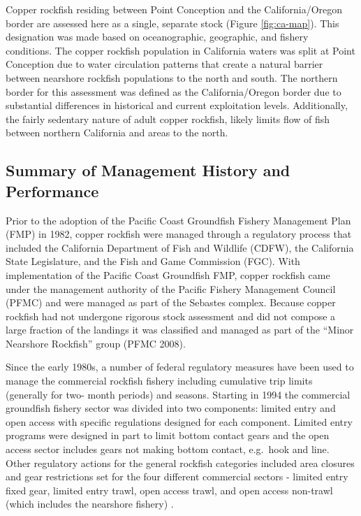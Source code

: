 \documentclass[11pt,
  english,
  letterpaper,
]{article}
\begin{document}
Copper rockfish residing between Point Conception and the California/Oregon border are assessed here as a single, separate stock (Figure \ref{fig:ca-map}). This designation was made based on oceanographic, geographic, and fishery conditions. The copper rockfish population in California waters was split at Point Conception due to water circulation patterns that create a natural barrier between nearshore rockfish populations to the north and south. The northern border for this assessment was defined as the California/Oregon border due to substantial differences in historical and current exploitation levels. Additionally, the fairly sedentary nature of adult copper rockfish, likely limits flow of fish between northern California and areas to the north.

\hypertarget{summary-of-management-history-and-performance}{%
\subsection{Summary of Management History and Performance}\label{summary-of-management-history-and-performance}}

Prior to the adoption of the Pacific Coast Groundfish Fishery Management Plan (FMP) in 1982, copper rockfish were managed through a regulatory process that included the California Department of Fish and Wildlife (CDFW), the California State Legislature, and the Fish and Game Commission (FGC). With implementation of the Pacific Coast Groundfish FMP, copper rockfish came under the management authority of the Pacific Fishery Management Council (PFMC) and were managed as part of the Sebastes complex. Because copper rockfish had not undergone rigorous stock assessment and did not compose a large fraction of the landings it was classified and managed as part of the ``Minor Nearshore Rockfish'' group (PFMC 2008).

Since the early 1980s, a number of federal regulatory measures have been used to manage the commercial rockfish fishery including cumulative trip limits (generally for two- month periods) and seasons. Starting in 1994 the commercial groundfish fishery sector was divided into two components: limited entry and open access with specific regulations designed for each component. Limited entry programs were designed in part to limit bottom contact gears and the open access sector includes gears not making bottom contact, e.g.~hook and line. Other regulatory actions for the general rockfish categories included area closures and gear restrictions set for the four different commercial sectors - limited entry fixed gear, limited entry trawl, open access trawl, and open access non-trawl (which includes the nearshore fishery) .
\end{document}
